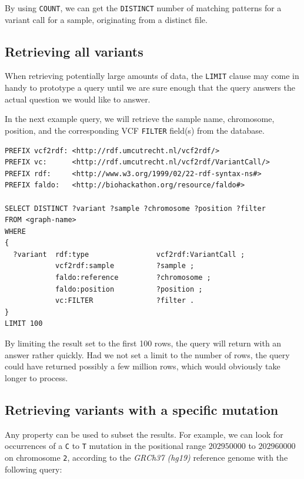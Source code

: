 \documentclass[11pt,a4paper,oneside]{book}
\begin{document}
  By using \texttt{COUNT}, we can get the \texttt{DISTINCT} number of
  matching patterns for a variant call for a sample, originating from
  a distinct file.

\subsection{Retrieving all variants}

  When retrieving potentially large amounts of data, the \texttt{LIMIT}
  clause may come in handy to prototype a query until we are sure enough
  that the query answers the actual question we would like to answer.

  In the next example query, we will retrieve the sample name,
  chromosome, position, and the corresponding VCF \texttt{FILTER} field(s)
  from the database.

\begin{siderules}
\begin{verbatim}
PREFIX vcf2rdf: <http://rdf.umcutrecht.nl/vcf2rdf/>
PREFIX vc:      <http://rdf.umcutrecht.nl/vcf2rdf/VariantCall/>
PREFIX rdf:     <http://www.w3.org/1999/02/22-rdf-syntax-ns#>
PREFIX faldo:   <http://biohackathon.org/resource/faldo#>

SELECT DISTINCT ?variant ?sample ?chromosome ?position ?filter
FROM <graph-name>
WHERE
{
  ?variant  rdf:type                vcf2rdf:VariantCall ;
            vcf2rdf:sample          ?sample ;
            faldo:reference         ?chromosome ;
            faldo:position          ?position ;
            vc:FILTER               ?filter .
}
LIMIT 100
\end{verbatim}
\end{siderules}

  By limiting the result set to the first 100 rows, the query will return
  with an answer rather quickly.  Had we not set a limit to the number of
  rows, the query could have returned possibly a few million rows, which
  would obviously take longer to process.

\subsection{Retrieving variants with a specific mutation}

  Any property can be used to subset the results.  For example, we can
  look for occurrences of a \texttt{C} to \texttt{T} mutation in the positional
  range $202950000$ to $202960000$ on chromosome \texttt{2}, according to the
  \emph{GRCh37 (hg19)} reference genome with the following query:
\end{document}
